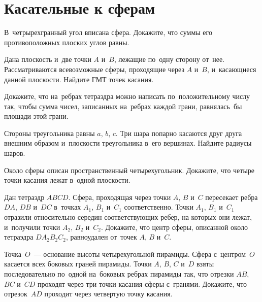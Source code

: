 
\section*{Касательные к сферам}


\begin{problems}

\item
В~четрырехгранный угол вписана сфера.
Докажите, что суммы его противоположных плоских углов равны.

\item
Дана плоскость и~две точки $A$ и~$B$, лежащие по~одну сторону от~нее.
Рассматриваются всевозможные сферы,
проходящие через $A$ и~$B$, и~касающиеся данной плоскости.
Найдите ГМТ точек касания.

\item
Докажите, что на~ребрах тетраэдра можно написать по~положительному числу так,
чтобы сумма чисел, записанных на~ребрах каждой грани, равнялась~бы площади этой
грани.

\item
Стороны треугольника равны $a$, $b$, $c$.
Три шара попарно касаются друг друга внешним образом и~плоскости треугольника
в~его вершинах.
Найдите радиусы шаров.

\item
Около сферы описан пространственный четырехугольник.
Докажите, что четыре точки касания лежат в~одной плоскости.

\item
Дан тетраэдр $ABCD$.
Сфера, проходящая через точки $A$, $B$ и~$C$ пересекает ребра
$DA$, $DB$ и~$DC$ в~точках $A_1$, $B_1$ и~$C_1$ соответственно.
Точки $A_1$, $B_1$ и~$C_1$ отразили относительно середин соответствующих ребер,
на которых они лежат, и~получили точки $A_2$, $B_2$ и~$C_2$.
Докажите, что центр сферы, описанной около тетраэдра $D A_2 B_2 C_2$,
равноудален от~точек $A$, $B$ и~$C$.

\item
Точка~$O$~--- основание высоты четырехугольной пирамиды.
Сфера с~центром~$O$ касается всех боковых граней пирамиды.
Точки $A$, $B$, $C$ и~$D$ взяты последовательно по~одной на~боковых ребрах
пирамиды так, что отрезки $AB$, $BC$ и~$CD$ проходят через три точки касания
сферы с~гранями.
Докажите, что отрезок~$AD$ проходит через четвертую точку касания.


\end{problems}
